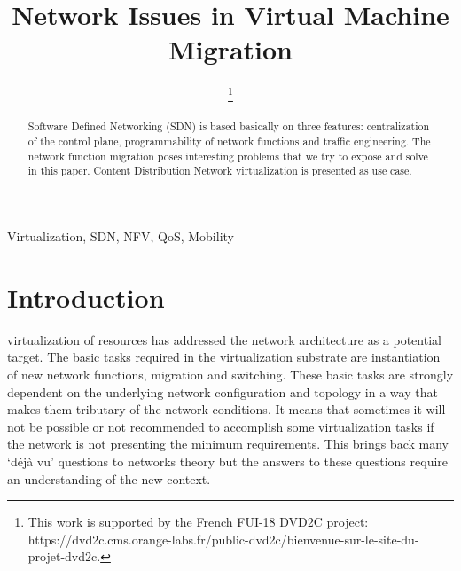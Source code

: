 \documentclass[letterpaper,conference]{IEEEtran}
\begin{document}
\title{{\fontsize{24pt}{24pt}\selectfont
Network Issues in Virtual Machine Migration}\\}
\author{
\thanks{This work is supported by the French FUI-18 DVD2C project: https://dvd2c.cms.orange-labs.fr/public-dvd2c/bienvenue-sur-le-site-du-projet-dvd2c.}}
\maketitle
\begin{abstract}
Software Defined Networking (SDN) is based basically on three features: centralization of the control plane, programmability of network functions and traffic engineering. The network function migration poses interesting problems that we try to expose and solve in this paper. Content Distribution Network virtualization is presented as use case.
\end{abstract}
\begin{IEEEkeywords}
Virtualization, SDN, NFV, QoS, Mobility
\end{IEEEkeywords}
\IEEEpeerreviewmaketitle

\section{Introduction}
 virtualization of resources has addressed the network architecture as a potential target. The basic tasks required in the virtualization substrate are instantiation of new network functions, migration and switching. These basic tasks are strongly dependent on the underlying network configuration and topology in a way that makes them tributary of the network conditions. It means that sometimes it will not be
possible or not recommended to accomplish some virtualization tasks if the network is not presenting the minimum requirements. This brings back many ‘déjà vu’ questions to networks theory but the answers to these questions require an understanding of the new context.
\end{document}
